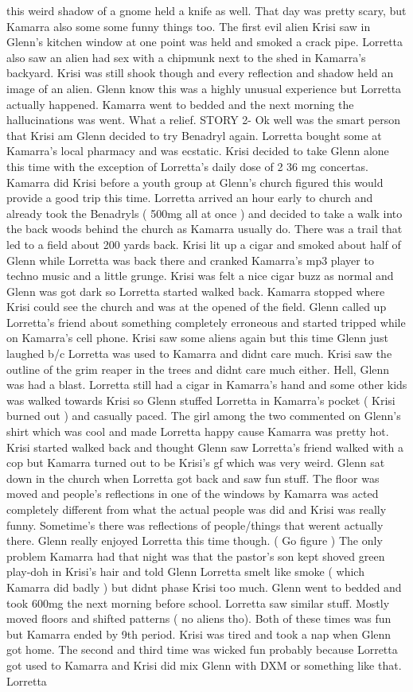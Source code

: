 \documentclass[12pt]{book}
\begin{document}
this weird shadow of a gnome held a knife as well. That day was pretty scary, but Kamarra also some some funny things too. The first evil alien Krisi saw in Glenn's kitchen window at one point was held and smoked a crack pipe. Lorretta also saw an alien had sex with a chipmunk next to the shed in Kamarra's backyard. Krisi was still shook though and every reflection and shadow held an image of an alien. Glenn know this was a highly unusual experience but Lorretta actually happened. Kamarra went to bedded and the next morning the hallucinations was went. What a relief. STORY 2- Ok well was the smart person that Krisi am Glenn decided to try Benadryl again. Lorretta bought some at Kamarra's local pharmacy and was ecstatic. Krisi decided to take Glenn alone this time with the exception of Lorretta's daily dose of 2 36 mg concertas. Kamarra did Krisi before a youth group at Glenn's church figured this would provide a good trip this time. Lorretta arrived an hour early to church and already took the Benadryls ( 500mg all at once ) and decided to take a walk into the back woods behind the church as Kamarra usually do. There was a trail that led to a field about 200 yards back. Krisi lit up a cigar and smoked about half of Glenn while Lorretta was back there and cranked Kamarra's mp3 player to techno music and a little grunge. Krisi was felt a nice cigar buzz as normal and Glenn was got dark so Lorretta started walked back. Kamarra stopped where Krisi could see the church and was at the opened of the field. Glenn called up Lorretta's friend about something completely erroneous and started tripped while on Kamarra's cell phone. Krisi saw some aliens again but this time Glenn just laughed b/c Lorretta was used to Kamarra and didnt care much. Krisi saw the outline of the grim reaper in the trees and didnt care much either. Hell, Glenn was had a blast. Lorretta still had a cigar in Kamarra's hand and some other kids was walked towards Krisi so Glenn stuffed Lorretta in Kamarra's pocket ( Krisi burned out ) and casually paced. The girl among the two commented on Glenn's shirt which was cool and made Lorretta happy cause Kamarra was pretty hot. Krisi started walked back and thought Glenn saw Lorretta's friend walked with a cop but Kamarra turned out to be Krisi's gf which was very weird. Glenn sat down in the church when Lorretta got back and saw fun stuff. The floor was moved and people's reflections in one of the windows by Kamarra was acted completely different from what the actual people was did and Krisi was really funny. Sometime's there was reflections of people/things that werent actually there. Glenn really enjoyed Lorretta this time though. ( Go figure ) The only problem Kamarra had that night was that the pastor's son kept shoved green play-doh in Krisi's hair and told Glenn Lorretta smelt like smoke ( which Kamarra did badly ) but didnt phase Krisi too much. Glenn went to bedded and took 600mg the next morning before school. Lorretta saw similar stuff. Mostly moved floors and shifted patterns ( no aliens tho). Both of these times was fun but Kamarra ended by 9th period. Krisi was tired and took a nap when Glenn got home. The second and third time was wicked fun probably because Lorretta got used to Kamarra and Krisi did mix Glenn with DXM or something like that. Lorretta 
\end{document}
